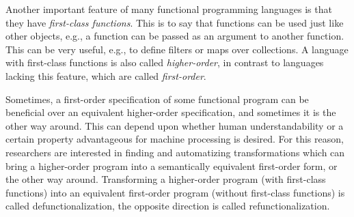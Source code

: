 Another important feature of many functional programming languages is that they have \textit{first-class functions}. This is to say that functions can be used just like other objects, e.g., a function can be passed as an argument to another function. This can be very useful, e.g., to define filters or maps over collections. A language with first-class functions is also called \textit{higher-order}, in contrast to languages lacking this feature, which are called \textit{first-order}.

Sometimes, a first-order specification of some functional program can be beneficial over an equivalent higher-order specification, and sometimes it is the other way around. This can depend upon whether human understandability or a certain property advantageous for machine processing is desired. For this reason, researchers are interested in finding and automatizing transformations which can bring a higher-order program into a semantically equivalent first-order form, or the other way around. Transforming a higher-order program (with first-class functions) into an equivalent first-order program (without first-class functions) is called defunctionalization\cite{reynolds72definitional}, the opposite direction is called refunctionalization\cite{danvy09refunctionalization}.

